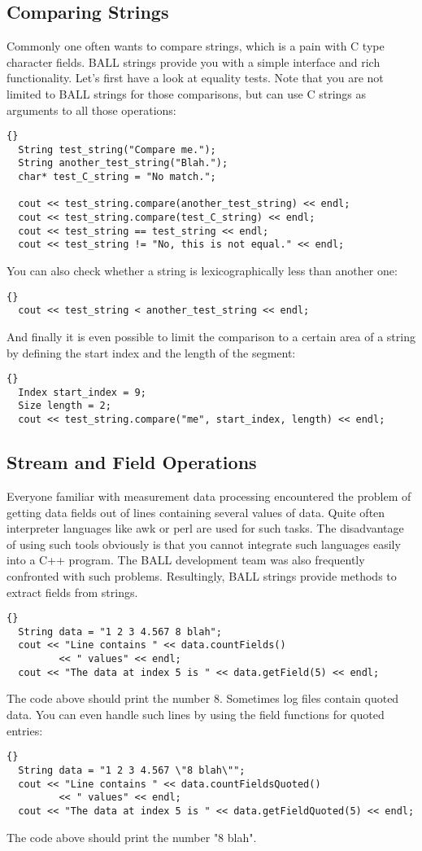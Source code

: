 \subsection{Comparing Strings}

Commonly one often wants to compare strings, which is a pain with C type
character fields. BALL strings provide you with a simple interface and rich
functionality. Let's first have a look at equality tests. Note that you are
not limited to BALL strings for those comparisons, but can use C strings
as arguments to all those operations:
\begin{lstlisting}{}
  String test_string("Compare me.");
  String another_test_string("Blah.");
  char* test_C_string = "No match.";

  cout << test_string.compare(another_test_string) << endl;
  cout << test_string.compare(test_C_string) << endl;
  cout << test_string == test_string << endl;
  cout << test_string != "No, this is not equal." << endl;
\end{lstlisting}
You can also check whether a string is lexicographically less than another
one:
\begin{lstlisting}{}
  cout << test_string < another_test_string << endl;
\end{lstlisting}
And finally it is even possible to limit the comparison to a certain area of
a string by defining the start index and the length of the segment:
\begin{lstlisting}{}
  Index start_index = 9;
  Size length = 2;
  cout << test_string.compare("me", start_index, length) << endl;
\end{lstlisting}

\subsection{Stream and Field Operations}

Everyone familiar with measurement data processing encountered the problem of
getting data fields out of lines containing several values of data. Quite
often interpreter languages like awk or perl are used for such tasks. The
disadvantage of using such tools obviously is that you cannot integrate such
languages easily into a C++ program. The BALL development team was also
frequently confronted with such problems. Resultingly, BALL strings provide
methods to extract fields from strings.
\begin{lstlisting}{}
  String data = "1 2 3 4.567 8 blah";
  cout << "Line contains " << data.countFields() 
		 << " values" << endl;
  cout << "The data at index 5 is " << data.getField(5) << endl;
\end{lstlisting}
The code above should print the number 8.
Sometimes log files contain quoted data. You can even handle such lines by
using the field functions for quoted entries:
\begin{lstlisting}{}
  String data = "1 2 3 4.567 \"8 blah\"";
  cout << "Line contains " << data.countFieldsQuoted() 
		 << " values" << endl;
  cout << "The data at index 5 is " << data.getFieldQuoted(5) << endl;
\end{lstlisting}
The code above should print the number "8 blah".

